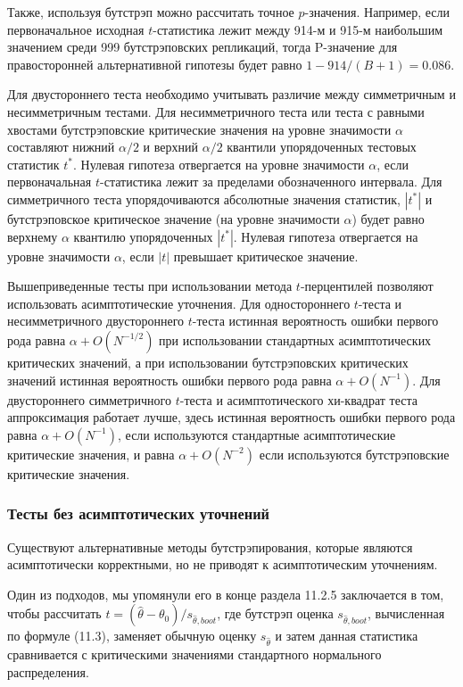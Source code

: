 Также, используя бутстрэп можно рассчитать точное $p$-значения. Например, если первоначальное исходная $t$-статистика лежит между 914-м и 915-м наибольшим значением среди 999 бутстрэповских репликаций, тогда P-значение для правосторонней альтернативной гипотезы будет равно $1-914/(B+1)=0.086$.

Для двустороннего теста необходимо учитывать различие между симметричным и несимметричным тестами. Для несимметричного теста или теста с равными хвостами бутстрэповские критические значения на уровне значимости $\alpha$ составляют нижний $\alpha/2$ и верхний $\alpha/2$ квантили упорядоченных тестовых статистик $t^*$. Нулевая гипотеза отвергается на уровне значимости $\alpha$, если первоначальная $t$-статистика лежит за пределами обозначенного интервала. Для симметричного теста упорядочиваются абсолютные значения статистик, $|t^*|$ и бутстрэповское критическое значение (на уровне значимости $\alpha$) будет равно верхнему $\alpha$ квантилю упорядоченных $|t^*|$. Нулевая гипотеза отвергается на уровне значимости $\alpha$, если $|t|$ превышает критическое значение.

Вышеприведенные тесты при использовании метода $t$-перцентилей позволяют использовать асимптотические уточнения. Для одностороннего $t$-теста и несимметричного двустороннего $t$-теста истинная вероятность ошибки первого рода равна $\alpha+O(N^{-1/2})$ при использовании стандартных асимптотических критических значений, а при использовании бутстрэповских критических значений  истинная вероятность ошибки первого рода равна  $\alpha+O(N^{-1})$. Для двустороннего симметричного $t$-теста и асимптотического хи-квадрат теста аппроксимация работает лучше, здесь истинная вероятность ошибки первого рода равна $\alpha+O(N^{-1})$, если используются стандартные асимптотические критические значения, и равна  $\alpha+O(N^{-2})$ если используются бутстрэповские критические значения. 


\subsubsection*{Тесты без асимптотических уточнений}

Существуют альтернативные методы бутстрэпирования, которые являются асимптотически корректными, но не приводят к асимптотическим уточнениям.

Один из подходов, мы упомянули его в конце раздела 11.2.5 заключается в том, чтобы рассчитать $t=(\hat{\theta}-\theta_0)/s_{\hat{\theta},boot}$, где бутстрэп оценка $s_{\hat{\theta},boot}$, вычисленная по формуле (11.3), заменяет обычную оценку $s_{\hat{\theta}}$ и затем данная статистика  сравнивается с критическими значениями стандартного нормального распределения.

